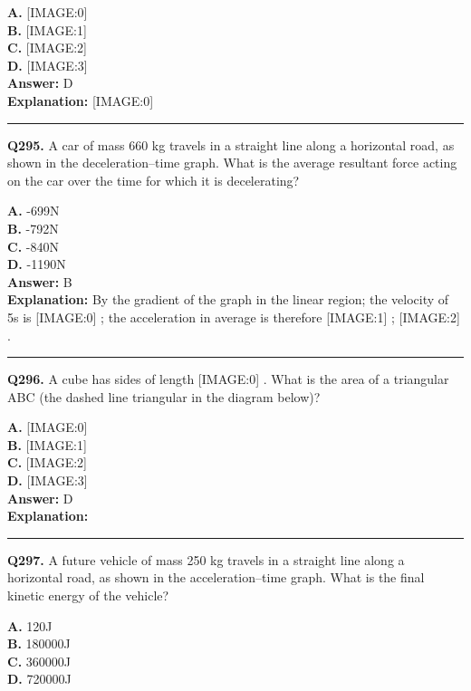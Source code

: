 \documentclass[12pt]{article}
\begin{document}
\textbf{A.} [IMAGE:0] \\
\textbf{B.} [IMAGE:1] \\
\textbf{C.} [IMAGE:2] \\
\textbf{D.} [IMAGE:3] \\

\textbf{Answer:} D \\
\textbf{Explanation:} [IMAGE:0]

\hrule
\vspace{1em}


\noindent
\textbf{Q295.} A car of mass 660 kg travels in a straight line along a horizontal road, as shown in the deceleration–time graph.
What is the average resultant force acting on the car over the time for which it is decelerating?



\textbf{A.} -699N \\
\textbf{B.} -792N \\
\textbf{C.} -840N \\
\textbf{D.} -1190N \\

\textbf{Answer:} B \\
\textbf{Explanation:} By the gradient of the graph in the linear region; the velocity of 5s is
[IMAGE:0]
; the acceleration in average is therefore
[IMAGE:1]
;
[IMAGE:2]
.

\hrule
\vspace{1em}


\noindent
\textbf{Q296.} A cube has sides of length
[IMAGE:0]
. What is the area of a triangular ABC (the dashed line triangular in the diagram below)?



\textbf{A.} [IMAGE:0] \\
\textbf{B.} [IMAGE:1] \\
\textbf{C.} [IMAGE:2] \\
\textbf{D.} [IMAGE:3] \\

\textbf{Answer:} D \\
\textbf{Explanation:} 

\hrule
\vspace{1em}


\noindent
\textbf{Q297.} A future vehicle of mass 250 kg travels in a straight line along a horizontal road, as shown in the acceleration–time graph.
What is the final kinetic energy of the vehicle?



\textbf{A.} 120J \\
\textbf{B.} 180000J \\
\textbf{C.} 360000J \\
\textbf{D.} 720000J \\
\end{document}
